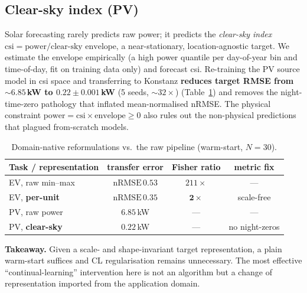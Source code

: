 \documentclass[conference]{IEEEtran}
\newcommand{\nrmse}{\mathrm{nRMSE}}
\begin{document}
\subsection{Clear-sky index (PV)}
Solar forecasting rarely predicts raw power; it predicts the \emph{clear-sky
index} $\mathrm{csi}=\text{power}/\text{clear-sky envelope}$, a near-stationary,
location-agnostic target. We estimate the envelope empirically (a high power
quantile per day-of-year bin and time-of-day, fit on training data only) and
forecast csi. Re-training the PV source model in csi space and transferring to
Konstanz \textbf{reduces target RMSE from ${\sim}6.85$\,kW to $0.22{\pm}0.001$\,kW}
(5 seeds, ${\sim}32\times$)
(Table~\ref{tab:reform}) and removes the night-time-zero pathology that inflated
mean-normalised nRMSE. The physical constraint $\text{power}=\mathrm{csi}\times
\text{envelope}\ge 0$ also rules out the non-physical predictions that plagued
from-scratch models.

\begin{table}[t]
\centering
\caption{Domain-native reformulations vs.\ the raw pipeline (warm-start, $N{=}30$).}
\label{tab:reform}
\begin{tabular}{lccc}
\toprule
Task / representation & transfer error & Fisher ratio & metric fix\\
\midrule
EV, raw min--max      & $\nrmse\,0.53$ & $211\times$ & ---\\
EV, \textbf{per-unit} & $\nrmse\,\mathbf{0.35}$ & $\mathbf{2\times}$ & scale-free\\
PV, raw power         & $6.85$\,kW & --- & ---\\
PV, \textbf{clear-sky}& $\mathbf{0.22}$\,kW & --- & no night-zeros\\
\bottomrule
\end{tabular}
\end{table}

\noindent\textbf{Takeaway.} Given a scale- and shape-invariant target
representation, a plain warm-start suffices and CL regularisation remains
unnecessary. The most effective ``continual-learning'' intervention here is not an
algorithm but a change of representation imported from the application domain.

\end{document}
